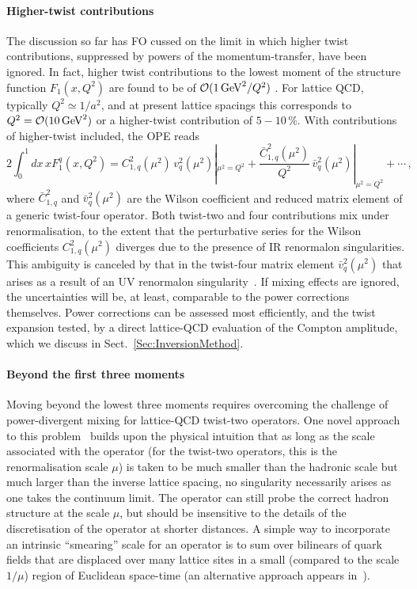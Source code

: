 \paragraph*{Higher-twist contributions}
%
The discussion so far has FO cussed on the limit in which higher twist contributions, suppressed by powers of the momentum-transfer, have been ignored. In fact, higher twist contributions to the lowest moment of the structure function $F_1(x,Q^2)$ are found to be of ${\cal O}(1\, \mbox{GeV}^2/Q^2)$ \cite{Blumlein:2008kz}.
%
For lattice QCD, typically $Q^2 \simeq 1/a^2$, and at present lattice spacings this corresponds to $Q^2 = {\cal O}(10\,\mbox{GeV}^2)$ or a higher-twist contribution of $5 - 10\, \%$. With contributions of higher-twist included, the OPE reads
\begin{equation}
2 \int_0^1 dx\, x F_1^q(x,Q^2) = C_{1,q}^2(\mu^2)\, v_q^2(\mu^2)|_{\mu^2=Q^2} + \frac{\bar{C}_{1,q}^2(\mu^2)}{Q^2}\, \bar{v}_q^2(\mu^2)|_{\mu^2=Q^2} + \cdots \,,
\label{tex}
\end{equation}
where $\bar{C}_{1,q}^2$ and $\bar{v}_q^2(\mu^2)$ are the Wilson coefficient and reduced matrix element of a generic twist-four operator. Both twist-two and four contributions mix under renormalisation, to the extent that the perturbative series for the Wilson coefficients $C_{1,q}^2(\mu^2)$ diverges due to the presence of IR renormalon singularities.
%
This ambiguity is canceled by that in the twist-four matrix element $\bar{v}_q^2(\mu^2)$ that arises as a result of an UV renormalon singularity~\cite{Martinelli:1996pk}. If mixing effects are ignored, the uncertainties will be, at least, comparable to the power corrections themselves.
%
Power corrections can be assessed most efficiently, and the twist expansion tested, by a direct lattice-QCD evaluation of the Compton amplitude, which we discuss in Sect.~\ref{Sec:InversionMethod}.

\paragraph*{Beyond the first three moments}
%
Moving beyond the lowest three moments requires overcoming the challenge of power-divergent mixing for lattice-QCD twist-two operators.
%
One novel approach to this problem~\cite{Davoudi:2012ya} builds upon the physical intuition that as long as the scale associated with the operator (for the twist-two operators, this is the renormalisation scale $\mu$) is taken to be much smaller than the hadronic scale but much larger than the inverse lattice spacing, no singularity necessarily arises as one takes the continuum limit.
%
The operator can still probe the correct hadron structure at the scale $\mu$, but should be insensitive to the details of the discretisation of the operator at shorter distances.
%
A simple way to incorporate an intrinsic ``smearing” scale for an operator is to sum over bilinears of quark fields that are displaced over many lattice sites in a small (compared to the scale $1/\mu$) region of Euclidean space-time (an alternative approach appears in~\cite{Monahan:2015lha}).


